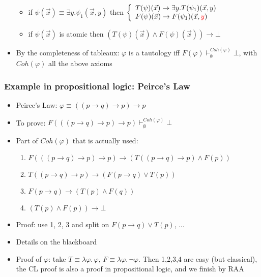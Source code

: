 \documentclass[handout,11pt]{beamer}
\newcommand{\red}[1]{\textcolor{red}{#1}}
\newcommand{\imp}{\rightarrow}
\begin{document}
\begin{frame}
\begin{itemize}[<+->]
\begin{itemize}
\item

 if $\psi(\vec{x})\equiv\exists y.\psi_1(\vec{x},y)$ then 
$\left\{\begin{array}{ll}
T(\psi)(\vec{x})\to \exists y.T(\psi_1)(\vec{x},y)\\
F(\psi)(\vec{x})\to F(\psi_1)(\vec{x},\red{y})
\end{array}\right.$

\item
 if $\psi(\vec{x})$ is atomic then 
 $(T(\psi)(\vec{x})\wedge F(\psi)(\vec{x})) \to \bot$
 \end{itemize} 
 \item By the completeness of tableaux: $\varphi$ is a tautology iff
 $F(\varphi)\vdash^{Coh(\varphi)}_\emptyset \bot$, 
 with $Coh(\varphi)$ all the above axioms
 \end{itemize} 
\end{frame}

\begin{frame}
\frametitle{Example in propositional logic: Peirce's Law}
 \begin{itemize}[<+->] 
    \item Peirce's Law: $\varphi\equiv((p\imp q)\imp p)\imp p$
    \item To prove: $F(((p\imp q)\imp p)\imp p) 
    \vdash^{Coh(\varphi)}_\emptyset\bot$    
    \item Part of $Coh(\varphi)$ that is actually used:
    \begin{enumerate}[<+->]
    	\item $F(((p\imp q)\imp p)\imp p) \imp (T((p\imp q)\imp p) \wedge F(p))$
    	\item $T((p\imp q)\imp p) \imp (F(p\imp q) \vee T(p))$
    	\item $F(p\imp q) \imp (T(p) \wedge F(q))$
    	\item $(T(p) \wedge F(p)) \imp \bot$
    \end{enumerate}
    \item Proof: use 1, 2, 3 and split on $F(p\imp q) \vee T(p)$, ...
    \item Details on the blackboard
    \item Proof of $\varphi$: take $T\equiv\lambda\varphi.\,\varphi$,
     $F\equiv\lambda\varphi.\,\neg\varphi$. Then 1,2,3,4 are easy
     (but classical), the CL proof is also a proof 
     in propositional logic, and we finish by RAA
 \end{itemize}
\end{frame}
\end{document}
